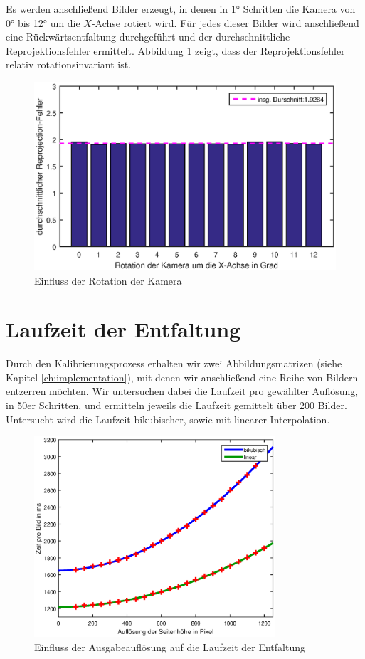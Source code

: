 Es werden anschließend Bilder erzeugt, in denen in 1° Schritten die Kamera von 0° bis 12° um die $X$-Achse rotiert wird. Für jedes dieser Bilder wird anschließend eine Rückwärtsentfaltung durchgeführt und der durchschnittliche Reprojektionsfehler ermittelt. Abbildung \ref{fig:influenceRot} zeigt, dass der Reprojektionsfehler relativ rotationsinvariant ist. 


\begin{figure}[!htb]
	\centering
	\includegraphics[width=\textwidth]{images/reprojectionErrorDeg2.eps}
	\caption{Einfluss der Rotation der Kamera}
	\label{fig:influenceRot}
\end{figure}


\section{Laufzeit der Entfaltung}
Durch den Kalibrierungsprozess erhalten wir zwei Abbildungsmatrizen (siehe Kapitel \ref{ch:implementation}), mit denen wir anschließend eine Reihe von Bildern entzerren möchten. Wir untersuchen dabei die Laufzeit pro gewählter Auflösung, in 50er Schritten, und ermitteln jeweils die Laufzeit gemittelt über 200 Bilder. Untersucht wird die Laufzeit bikubischer, sowie mit linearer Interpolation. 

\begin{figure}[!htb]
	\centering
	\includegraphics[width=0.8\textwidth]{images/runningTimePerSlantheight.eps}
	\caption{Einfluss der Ausgabeauflösung auf die Laufzeit der Entfaltung}
	\label{fig:influenceRes2}
\end{figure}




